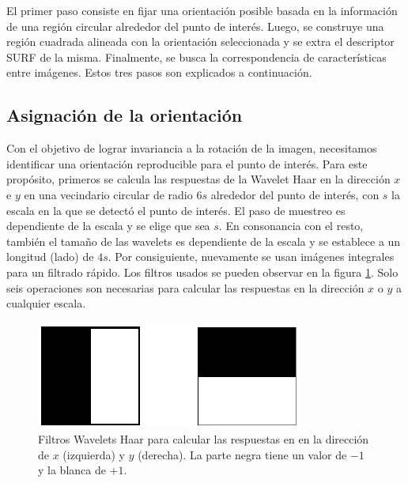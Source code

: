 El primer paso consiste en fijar una orientación posible basada en la información de una región circular alrededor del punto de interés. Luego, se construye una región cuadrada alineada con la orientación seleccionada y se extra el descriptor SURF de la misma. Finalmente, se busca la correspondencia de características entre imágenes. Estos tres pasos son explicados a continuación.

\subsection{Asignación de la orientación}
Con el objetivo de lograr invariancia a la rotación de la imagen, necesitamos identificar una orientación reproducible para el punto de interés. Para este propósito, primeros se calcula las respuestas de la Wavelet Haar en la dirección $x$ e $y$ en una vecindario circular de radio $6s$ alrededor del punto de interés, con $s$ la escala en la que se detectó el punto de interés. El paso de muestreo es dependiente de la escala y se elige que sea $s$. En consonancia con el resto, también el tamaño de las wavelets es dependiente de la escala y se establece a un longitud (lado) de $4s$. Por consiguiente, nuevamente se usan imágenes integrales para un filtrado rápido. Los filtros usados se pueden observar en la figura \ref{fig:haarwavelets}. Solo seis operaciones son necesarias para calcular las respuestas en la dirección $x$ o $y$ a cualquier escala.

\begin{figure}[tbhp]
   \centering
        \includegraphics[scale=0.4]{./figs/haarwavelets}
    \caption[]{Filtros Wavelets Haar para calcular las respuestas en en la dirección de $x$ (izquierda) y $y$ (derecha). La parte negra tiene un valor de $-1$ y la blanca de $+1$.}
   \label{fig:haarwavelets}                %
\end{figure}

